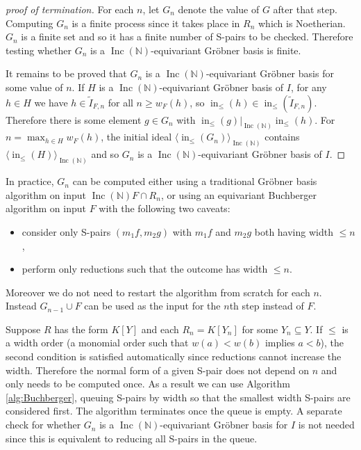 \documentclass{article}
\theoremstyle{plain}
\theoremstyle{definition}
\numberwithin{equation}{section}
\newcommand{\B}[1]{\mathbb #1}
\newcommand{\ideal}[1]{\langle #1 \rangle}
\DeclareMathOperator{\initial}{in}
\newcommand{\Inc}{\operatorname{Inc}(\B N)}
\newcommand{\LT}{\initial_{\leq}}
\begin{document}
\begin{proof}[proof of termination]
For each $n$, let $G_n$ denote the value of $G$ after that step.  Computing $G_n$ is a finite process since it takes place in $R_n$ which is Noetherian.  $G_n$ is a finite set and so it has a finite number of S-pairs to be checked.  Therefore testing whether $G_n$ is a $\Inc$-equivariant Gr\"obner basis is finite.

It remains to be proved that $G_n$ is a $\Inc$-equivariant Gr\"obner basis for some value of $n$.  If $H$ is a $\Inc$-equivariant Gr\"obner basis of $I$, for any $h \in H$ we have $h \in \tilde{I}_{F,n}$ for all $n \geq w_F(h)$, so $\LT(h) \in \LT(\tilde{I}_{F,n})$.  Therefore there is some element $g \in G_n$ with $\LT(g)|_{\Inc} \LT(h)$.  For $n = \max_{h\in H} w_F(h)$, the initial ideal $\ideal{\LT(G_n)}_{\Inc}$ contains $\ideal{\LT(H)}_{\Inc}$ and so $G_n$ is a $\Inc$-equivariant Gr\"obner basis of $I$.
\end{proof}

In practice, $G_n$ can be computed either using a traditional Gr\"obner basis algorithm on input $\Inc F \cap R_n$, or using an equivariant Buchberger algorithm on input $F$ with the following two caveats:
\begin{itemize}
 \item consider only S-pairs $(m_1f, m_2g)$ with $m_1f$ and $m_2g$ both having width $\leq n$,
 \item perform only reductions such that the outcome has width $\leq n$.
\end{itemize}
Moreover we do not need to restart the algorithm from scratch for each $n$.  Instead $G_{n-1} \cup F$ can be used as the input for the $n$th step instead of $F$.

Suppose $R$ has the form $K[Y]$ and each $R_n = K[Y_n]$ for some $Y_n \subseteq Y$.  If $\leq$ is a width order (a monomial order such that $w(a) < w(b)$ implies $a < b$), the second condition is satisfied automatically since reductions cannot increase the width.  Therefore the normal form of a given S-pair does not depend on $n$ and only needs to be computed once.  As a result we can use Algorithm \ref{alg:Buchberger}, queuing S-pairs by width so that the smallest width S-pairs are considered first.  The algorithm terminates once the queue is empty.  A separate check for whether $G_n$ is a $\Inc$-equivariant Gr\"obner basis for $I$ is not needed since this is equivalent to reducing all S-pairs in the queue.




\end{document}
